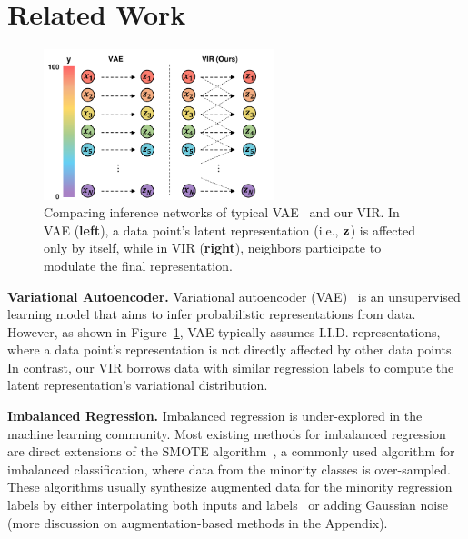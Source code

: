 \section{Related Work}
%
\begin{figure}
\centering
\vskip -0.23in
\includegraphics[width=0.6\textwidth]{VIR_1.pdf}
\vskip -0.3cm
    \caption{Comparing inference networks of typical VAE~\citep{VAE} and our VIR. In VAE (\textbf{left}), a data point’s latent representation (i.e., ${\bf z}$) is affected only by itself, while in VIR (\textbf{right}), neighbors participate to modulate the final representation.}    
\vskip -0.7cm
\label{encoder-diff}
\end{figure}
%
\textbf{Variational Autoencoder.} 
Variational autoencoder (VAE)~\citep{VAE} is an unsupervised learning model that aims to infer probabilistic representations from data. However, as shown in Figure~\ref{encoder-diff}, VAE typically assumes I.I.D. representations, where a data point's representation is not directly affected by other data points. In contrast, our VIR borrows data with similar regression labels to compute the latent representation's variational distribution.


\textbf{Imbalanced Regression.} 
Imbalanced regression is under-explored in the machine learning community. Most existing methods for imbalanced regression are direct extensions of the SMOTE algorithm~\citep{SMOTE}, a commonly used algorithm for imbalanced classification, where data from the minority classes is over-sampled. These algorithms usually synthesize augmented data for the minority regression labels by either interpolating both inputs and labels~\citep{IRrelated1} or adding Gaussian noise~\citep{IRrelated2,IRrelated3} (more discussion on augmentation-based methods in the Appendix).


